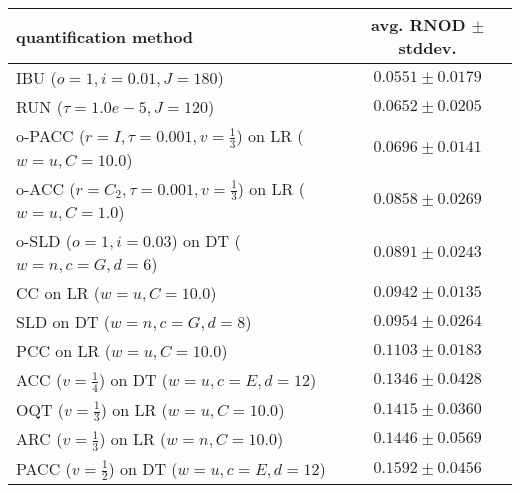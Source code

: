 \begin{tabular}{lc}
  \toprule
  quantification method & avg. RNOD $\pm$ stddev. \\
  \midrule
  IBU ($o=1, i=0.01, J=180$) & $\mathbf{0.0551 \pm 0.0179}$ \\
  RUN ($\tau=1.0e-5, J=120$) & $0.0652 \pm 0.0205$ \\
  o-PACC ($r=I, \tau=0.001, v=\frac{1}{3}$) on LR ($w=u, C=10.0$) & $0.0696 \pm 0.0141$ \\
  o-ACC ($r=C_2, \tau=0.001, v=\frac{1}{3}$) on LR ($w=u, C=1.0$) & $0.0858 \pm 0.0269$ \\
  o-SLD ($o=1, i=0.03$) on DT ($w=n, c=G, d=6$) & $0.0891 \pm 0.0243$ \\
  CC on LR ($w=u, C=10.0$) & $0.0942 \pm 0.0135$ \\
  SLD on DT ($w=n, c=G, d=8$) & $0.0954 \pm 0.0264$ \\
  PCC on LR ($w=u, C=10.0$) & $0.1103 \pm 0.0183$ \\
  ACC ($v=\frac{1}{4}$) on DT ($w=u, c=E, d=12$) & $0.1346 \pm 0.0428$ \\
  OQT ($v=\frac{1}{3}$) on LR ($w=u, C=10.0$) & $0.1415 \pm 0.0360$ \\
  ARC ($v=\frac{1}{3}$) on LR ($w=n, C=10.0$) & $0.1446 \pm 0.0569$ \\
  PACC ($v=\frac{1}{2}$) on DT ($w=u, c=E, d=12$) & $0.1592 \pm 0.0456$ \\
  \bottomrule
\end{tabular}
